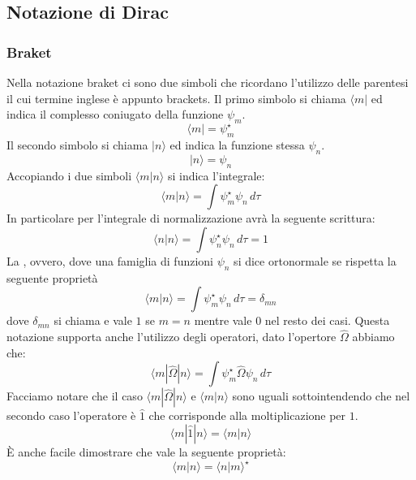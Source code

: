 \subsection{Notazione di Dirac}
\subsubsection{Braket}
Nella notazione braket ci sono due simboli che ricordano l'utilizzo delle parentesi il cui termine inglese è appunto brackets. Il primo simbolo si chiama  $\langle m |$ ed indica il complesso coniugato della funzione $\psi_m$.
$$\langle m | = \psi_m^{\star}$$
Il secondo simbolo si chiama  $| n \rangle$ ed indica la funzione stessa $\psi_n$.
$$| n \rangle = \psi_n$$
Accopiando i due simboli $\langle m | n \rangle$ si indica l'integrale:
$$\langle m | n \rangle = \int \psi_m^{\star} \psi_n\, d\tau$$
In particolare per l'integrale di normalizzazione avrà la seguente scrittura:
$$\langle n | n \rangle = \int \psi_n^{\star} \psi_n\, d\tau = 1$$
La , ovvero, dove una famiglia di funzioni $\psi_n$ si dice ortonormale se rispetta la seguente proprietà
$$\langle m | n \rangle = \int \psi_m^{\star} \psi_n\, d\tau = \delta_{mn}$$
dove $\delta_{mn}$ si chiama  e vale $1$ se $m = n$ mentre vale $0$ nel resto dei casi.
Questa notazione supporta anche l'utilizzo degli operatori, dato l'opertore $\hat{\Omega}$ abbiamo che:
$$\langle m | \hat{\Omega} | n \rangle = \int \psi_m^{\star} \hat{\Omega} \psi_n\, d\tau$$
Facciamo notare che il caso $\langle m | \hat{\Omega} | n \rangle$ e $\langle m | n \rangle$ sono uguali sottointendendo che nel secondo caso l'operatore è $\hat{1}$ che corrisponde alla moltiplicazione per $1$.
$$\langle m | \hat{1} | n \rangle = \langle m | n \rangle$$
È anche facile dimostrare che vale la seguente proprietà:
$$\langle m | n \rangle = {\langle n | m \rangle}^{\star}$$
